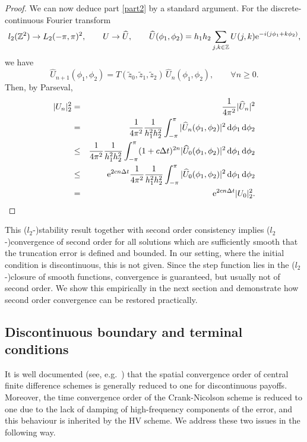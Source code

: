 {\begin{proof}
We can now deduce part \ref{part2} by a standard argument. For the discrete-continuous Fourier transform
\[
l_2(\mathbb{Z}^2) \rightarrow L_2(-\pi,\pi)^2, \qquad U \rightarrow \widehat{U}, \qquad \widehat{U}(\phi_1,\phi_2) = h_1 h_2 \sum_{j,k \in \mathbb{Z}} U(j,k) {\rm e}^{-i (j \phi_1 + k \phi_2)},
\]
we have
\[
\widehat{U}_{n+1}(\phi_1,\phi_2) = T(\tilde{z}_0, \tilde{z}_1, \tilde{z}_2) \, \widehat{U}_{n}(\phi_1,\phi_2), \qquad \forall n\ge 0.
\]
Then, by Parseval,
\begin{eqnarray*}
|U_n|_2^2 &=& \frac{1}{4 \pi^2} |\widehat{U}_n|^2  \\
&=& \frac{1}{4 \pi^2} 
\frac{1}{h_1^2 h_2^2} \int_{-\pi}^\pi |\widehat{U}_n(\phi_1,\phi_2)|^2 
\, {\rm d} \phi_1 \, {\rm d} \phi_2 \\
&\le& \frac{1}{4 \pi^2} 
\frac{1}{h_1^2 h_2^2} \int_{-\pi}^\pi (1+c \Delta t)^{2n} |\widehat{U}_0(\phi_1,\phi_2)|^2 
\, {\rm d} \phi_1 \, {\rm d} \phi_2 \\
&\le& {\rm e}^{2 c n \Delta t}  \frac{1}{4 \pi^2} 
\frac{1}{h_1^2 h_2^2} \int_{-\pi}^\pi |\widehat{U}_0(\phi_1,\phi_2)|^2 
\, {\rm d} \phi_1 \, {\rm d} \phi_2 \\ 
&=& {\rm e}^{2 c n \Delta t}  |U_0|_2^2.
\end{eqnarray*}
\end{proof}



This ($l_2$-)stability result together with second order consistency implies ($l_2$-)convergence of second order for all solutions which
are sufficiently smooth that the truncation error is defined and bounded. In our setting, where the initial condition is discontinuous, this is not given. Since the step function lies in the ($l_2$-)closure of smooth functions, convergence is guaranteed, but usually not of second order. We show this empirically in the next section and demonstrate how second order convergence can be restored practically.




\subsection{Discontinuous boundary and terminal conditions}

It is well documented (see, e.g.\ \cite{pooley2003}) that the spatial convergence order of central finite difference schemes is generally reduced to one for discontinuous payoffs. Moreover, the time convergence order of the Crank-Nicolson scheme is reduced to one due to the lack of damping of high-frequency components of the error, and this behaviour is inherited by the HV scheme. We address these two issues in the following way.

}
